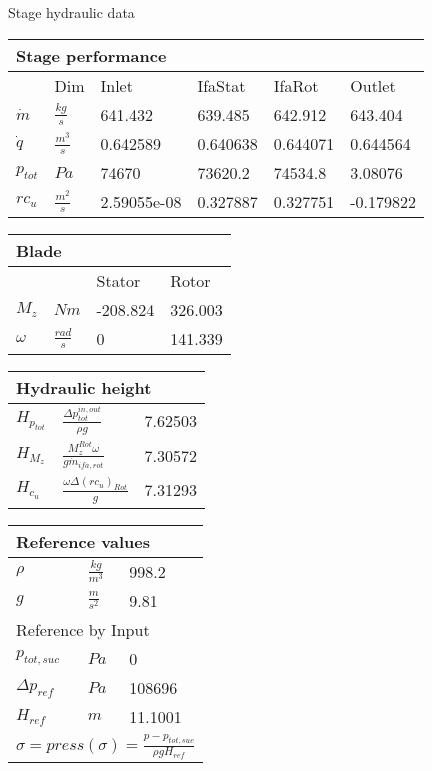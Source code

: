{\huge Stage hydraulic data}
\vspace{20pt}\newline
\begin{tabular}{|l|l|l|l|l|l|}
\multicolumn{6}{l}{Stage performance} \\ 
\hline
& Dim & Inlet& IfaStat & IfaRot  & Outlet \\ 
\hline
$\dot m $ & $\frac{kg}{s}$ & 641.432 & 639.485 & 642.912 & 643.404 \\ 
\hline
$\dot q$ & $\frac{m^3}{s}$ & 0.642589 & 0.640638 & 0.644071 & 0.644564 \\ 
\hline
$p_{tot}$ & $Pa$ & 74670 & 73620.2 & 74534.8 & 3.08076 \\ 
\hline
$rc_u$ & $\frac{m^2}{s}$ & 2.59055e-08 & 0.327887 & 0.327751 & -0.179822 \\ 
\hline
\end{tabular}
\vspace{20pt}\newline
\begin{tabular}{|l|l|l|l|}
\multicolumn{4}{l}{Blade} \\ 
\hline
& & Stator & Rotor\\ 
\hline
$M_z$ &$Nm$ & -208.824& 326.003\\ 
\hline
$\omega$ & $\frac{rad}{s}$ & 0& 141.339\\ 
\hline
\end{tabular}
\vspace{20pt}\newline
\begin{tabular}{|l|l|l|}
\multicolumn{3}{l}{Hydraulic height} \\ 
\hline
$H_{p_{tot}}$ &$\frac{\Delta p^{in,out}_{tot}}{\rho g}$ & 7.62503 \\ 
\hline
$H_{M_z}$ &$\frac{M_z^{Rot} \omega}{g \dot m_{ifa,rot}}$ & 7.30572 \\ 
\hline
$H_{c_u}$ &$\frac{\omega \Delta(r c_u)_{Rot} }{g}$ & 7.31293 \\ 
\hline
\end{tabular}
\vspace{20pt}\newline
\begin{tabular}{|l|l|l|}
\multicolumn{3}{l}{Reference values} \\ 
\hline
$\rho$ &$\frac{kg}{m^3}$ & 998.2 \\ 
\hline
$g$ &$\frac{m}{s^2}$ & 9.81 \\ 
\hline
\multicolumn{3}{|l|}{Reference by Input} \\ 
\hline
$p_{tot,suc}$ &$Pa$ & 0 \\ 
\hline
$\Delta p_{ref}$ &$Pa$ & 108696 \\ 
\hline
$H_{ref}$ &$m$ & 11.1001 \\ 
\hline
\multicolumn{3}{|l|}{$\sigma = press(\sigma) = \frac{p-p_{tot,suc}}{\rho g H_{ref}}$} \\ 
\hline
\end{tabular}
